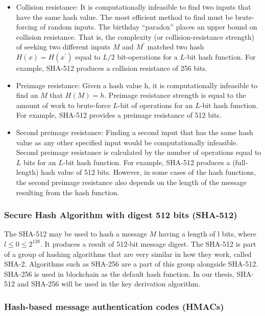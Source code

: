 \begin{itemize}
  \item Collision resistance: It is computationally infeasible to find two inputs that have the same hash value. The most efficient method to find must be brute-forcing of random inputs. The birthday ``paradox” places an upper bound on collision resistance. That is, the complexity (or collision-resistance strength) of seeking two different inputs $M$ and $M^{\prime}$ matched two hash $H(x) = H(x^{\prime})$ equal to $L/2$ bit-operations for a $L$-bit hash function. For example, SHA-512 produces a collision resistance of 256 bits.

  \item Preimage resistance: Given a hash value h, it is computationally infeasible to find an $M$ that $H(M)=h$. Preimage resistance strength is equal to the amount of work to brute-force $L$-bit of operations for an $L$-bit hash function. For example, SHA-512 provides a preimage resistance of 512 bits.

  \item Second preimage resistance: Finding a second input that has the same hash value as any other specified input would be computationally infeasible. Second preimage resistance is calculated by the number of operations equal to $L$ bits for an $L$-bit hash function. For example, SHA-512 produces a (full-length) hash value of 512 bits. However, in some cases of the hash functions, the second preimage resistance also depends on the length of the message resulting from the hash function.
\end{itemize}


\subsubsection{Secure Hash Algorithm with digest 512 bits (SHA-512)}

The SHA-512 may be used to hash a message $M$ having a length of l bits, where $l \leq 0 \leq 2^{128}$. It produces a result of 512-bit message digest. The SHA-512 is part of a group of hashing algorithms that are very similar in how they work, called SHA-2. Algorithms such as SHA-256 are a part of this group alongside SHA-512. SHA-256 is used in blockchain as the default hash function. In our thesis, SHA-512 and SHA-256 will be used in the key derivation algorithm.

\subsubsection{Hash-based message authentication codes (HMACs)}

